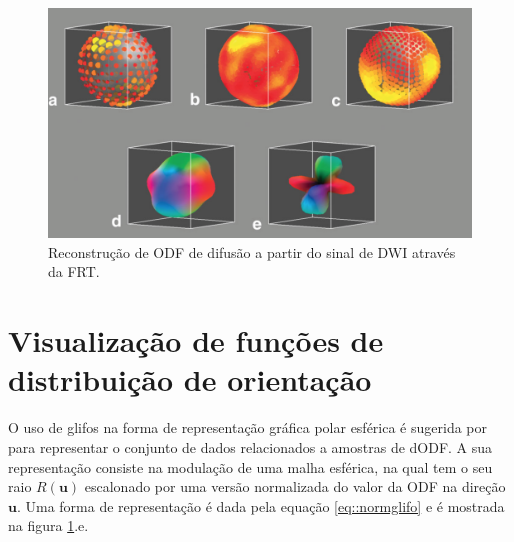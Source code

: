 \documentclass[
    12pt,                %
    oneside,            %
    a4paper,            %
    english,            %
    french,                %
    spanish,            %
    brazil                %
    ]{abntex2}
\begin{document}
\begin{figure}[H]

    \centering

    \includegraphics[width=0.9\linewidth, angle=0]{figs/Exemplo_Trabalhos_Relacionados/Esquema_QBall.png}
    \caption{Reconstrução de ODF de difusão a partir do sinal de DWI através da FRT.}
    \label{fig::Esquema_QBall}
\end{figure}

\section{Visualização de funções de distribuição de orientação}
\label{sec::trabalhos_relacionados_glifos}

O uso de glifos na forma de representação gráfica polar esférica é sugerida por  para representar o conjunto de dados relacionados a amostras de dODF. A sua representação consiste na modulação de uma malha esférica, na qual tem o seu raio $R(\textbf{u})$ escalonado por uma versão normalizada do valor da ODF na direção $\textbf{u}$. Uma forma de representação é dada pela equação \ref{eq::normglifo} e é mostrada na figura \ref{fig::Esquema_QBall}.e.
\end{document}
